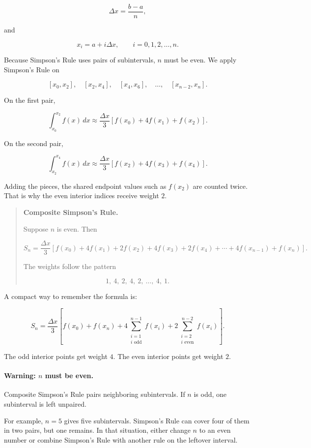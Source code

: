 \[
\Delta x=\frac{b-a}{n},
\]

and

\[
x_i=a+i\Delta x,
\qquad
i=0,1,2,\ldots,n.
\]

Because Simpson's Rule uses pairs of subintervals, \(n\) must be even.  We apply
Simpson's Rule on

\[
[x_0,x_2],\quad [x_2,x_4],\quad [x_4,x_6],\quad \ldots,\quad [x_{n-2},x_n].
\]

On the first pair,

\[
\int_{x_0}^{x_2} f(x)\,dx
\approx
\frac{\Delta x}{3}
\left[
f(x_0)+4f(x_1)+f(x_2)
\right].
\]

On the second pair,

\[
\int_{x_2}^{x_4} f(x)\,dx
\approx
\frac{\Delta x}{3}
\left[
f(x_2)+4f(x_3)+f(x_4)
\right].
\]

Adding the pieces, the shared endpoint values such as \(f(x_2)\) are counted twice.
That is why the even interior indices receive weight \(2\).

\begin{quote}
\textbf{Composite Simpson's Rule.}

Suppose \(n\) is even.  Then

\[
\boxed{
S_n=
\frac{\Delta x}{3}
\left[
f(x_0)
+4f(x_1)
+2f(x_2)
+4f(x_3)
+2f(x_4)
+\cdots
+4f(x_{n-1})
+f(x_n)
\right].
}
\]

The weights follow the pattern

\[
1,\ 4,\ 2,\ 4,\ 2,\ \ldots,\ 4,\ 1.
\]
\end{quote}

A compact way to remember the formula is:

\[
S_n
=
\frac{\Delta x}{3}
\left[
f(x_0)+f(x_n)
+
4\sum_{\substack{i=1\\ i\text{ odd}}}^{n-1} f(x_i)
+
2\sum_{\substack{i=2\\ i\text{ even}}}^{n-2} f(x_i)
\right].
\]

The odd interior points get weight \(4\).  The even interior points get weight \(2\).

\paragraph{Warning: \(n\) must be even.}
Composite Simpson's Rule pairs neighboring subintervals.  If \(n\) is odd, one
subinterval is left unpaired.

For example, \(n=5\) gives five subintervals.  Simpson's Rule can cover four of them
in two pairs, but one remains.  In that situation, either change \(n\) to an even number
or combine Simpson's Rule with another rule on the leftover interval.

